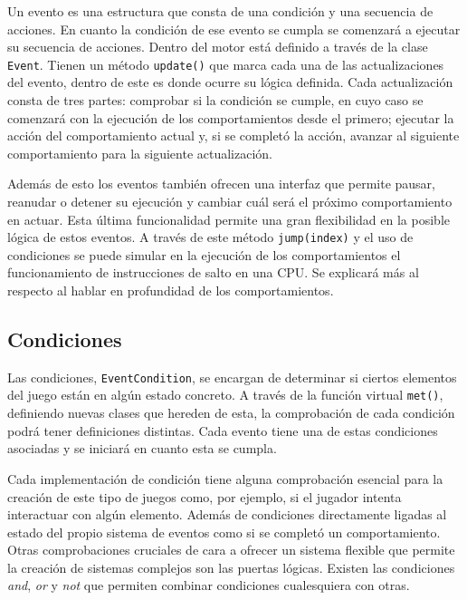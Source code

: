 \medskip

Un evento es una estructura que consta de una condición y una secuencia de acciones. En cuanto la condición de ese evento se cumpla se comenzará a ejecutar su secuencia de acciones. Dentro del motor está definido a través de la clase \texttt{Event}. Tienen un método \texttt{update()} que marca cada una de las actualizaciones del evento, dentro de este es donde ocurre su lógica definida. Cada actualización consta de tres partes: comprobar si la condición se cumple, en cuyo caso se comenzará con la ejecución de los comportamientos desde el primero; ejecutar la acción del comportamiento actual y, si se completó la acción, avanzar al siguiente comportamiento para la siguiente actualización. 

\medskip

Además de esto los eventos también ofrecen una interfaz que permite pausar, reanudar o detener su ejecución y cambiar cuál será el próximo comportamiento en actuar. Esta última funcionalidad permite una gran flexibilidad en la posible lógica de estos eventos. A través de este método \texttt{jump(index)} y el uso de condiciones se puede simular en la ejecución de los comportamientos el funcionamiento de instrucciones de salto en una CPU. Se explicará más al respecto al hablar en profundidad de los comportamientos. 

\subsection{Condiciones}
Las condiciones, \texttt{EventCondition}, se encargan de determinar si ciertos elementos del juego están en algún estado concreto. A través de la función virtual \texttt{met()}, definiendo nuevas clases que hereden de esta, la comprobación de cada condición podrá tener definiciones distintas. Cada evento tiene una de estas condiciones asociadas y se iniciará en cuanto esta se cumpla. 

\medskip

Cada implementación de condición tiene alguna comprobación esencial para la creación de este tipo de juegos como, por ejemplo, si el jugador intenta interactuar con algún elemento. Además de condiciones directamente ligadas al estado del propio sistema de eventos como si se completó un comportamiento. Otras comprobaciones cruciales de cara a ofrecer un sistema flexible que permite la creación de sistemas complejos son las puertas lógicas. Existen las condiciones \textit{and}, \textit{or} y \textit{not} que permiten combinar condiciones cualesquiera con otras. 

